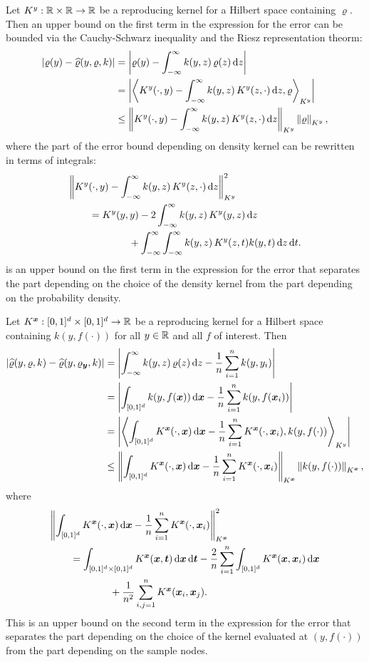\documentclass{amsart}
\newcommand{\hvarrho}{\widehat{\varrho}}
\newcommand{\KY}{K^y}
\newcommand{\KX}{K^{\vx}}
\begin{document}
Let $\KY:\reals \times \reals \to \reals$ be a reproducing kernel for a Hilbert space containing $\varrho$.  Then an upper bound on the first term in the expression for the error can be bounded via the Cauchy-Schwarz inequality and the Riesz representation theorm:
\begin{align}
\label{eq:firstbd}
\abs{\varrho(y) - \hvarrho(y,\varrho,k)} 
& = \abs{\varrho(y) - \int_{-\infty}^{\infty} k(y,z) \, \varrho(z) \, \dif z} \\
\nonumber
& = \abs{\ip[\KY]{\KY(\cdot,y) - \int_{-\infty}^{\infty} k(y,z) \, \KY(z,\cdot) \,  \dif z}{\varrho} } \\
\nonumber
& \le  \norm[\KY]{\KY(\cdot,y) - \int_{-\infty}^{\infty} k(y,z) \, \KY(z,\cdot) \, \dif z} \norm[\KY]{\varrho}, 
\end{align}
where the part of the error bound depending on density kernel can be rewritten in terms of integrals:
\begin{align}
\label{eq:kquality}
\MoveEqLeft{\norm[\KY]{\KY(\cdot,y) - \int_{-\infty}^{\infty} k(y,z) \, \KY(z,\cdot) \, \dif z}^2} \\ \nonumber
&=  \KY(y,y) - 2 \int_{-\infty}^{\infty} k(y,z) \, \KY(y,z) \, \dif z \\ \nonumber
& \qquad \qquad + \int_{-\infty}^{\infty} \int_{-\infty}^{\infty}  k(y,z) \, \KY(z,t) k(y,t)\, \dif z \, \dif t.
\end{align}
 is an upper bound on the first term in the expression for the error that separates the part depending on the choice of the density kernel from the part depending on the probability density.

Let $\KX: [0,1]^d \times [0,1]^d\to \reals$ be a reproducing kernel for a Hilbert space containing $k(y,f(\cdot))$ for all $y \in \mathbb{R}$ and all $f$ of interest. Then
\begin{align*}
\abs{\hvarrho(y,\varrho,k) - \hvarrho(y,\varrho_{\vy},k)} 
& = \abs{\int_{-\infty}^{\infty} k(y,z) \, \varrho(z) \, \dif z - 
\frac 1n \sum_{i=1}^n k(y,y_i)} \\
& = \abs{\int_{[0,1]^d} k(y,f(\vx)) \, \dif \vx - 
\frac 1n \sum_{i=1}^n k(y,f(\vx_i))} \\
& = \abs{\ip[\KY]{\int_{[0,1]^d} \KX(\cdot,\vx) \, \dif \vx - 
\frac 1n \sum_{i=1}^n \KX(\cdot,\vx_i)}{k(y,f(\cdot)) }} \\
& \le  \norm[\KX]{\int_{[0,1]^d} \KX(\cdot,\vx) \, \dif \vx - 
\frac 1n \sum_{i=1}^n \KX(\cdot,\vx_i)} \norm[\KX]{k(y,f(\cdot)) } ,
\end{align*}
where
\begin{align*}
\MoveEqLeft{\norm[\KX]{\int_{[0,1]^d} \KX(\cdot,\vx) \, \dif \vx - 
\frac 1n \sum_{i=1}^n \KX(\cdot,\vx_i)}^2} \\
&=  \int_{[0,1]^d \times [0,1]^d} \KX(\vx,\vt) \, \dif \vx \, \dif \vt - 
\frac 2n \sum_{i=1}^n \int_{[0,1]^d} \KX(\vx,\vx_i) \, \dif \vx \\
& \qquad \qquad + \frac 1{n^2} \sum_{i,j=1}^n  \KX(\vx_i,\vx_j) .
\end{align*}
This is an upper bound on the second term in the expression for the error that separates the part depending on the choice of the kernel evaluated at $(y,f(\cdot))$ from the part depending on the sample nodes.
\end{document}

